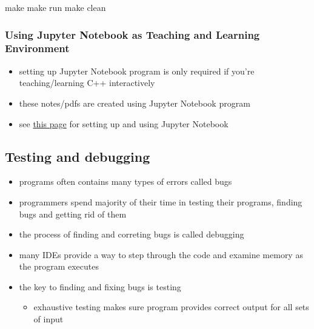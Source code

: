 \documentclass[11pt]{article}
\providecommand{\tightlist}{%
      \setlength{\itemsep}{0pt}\setlength{\parskip}{0pt}}
\newenvironment{Shaded}{}{}
\newcommand{\FunctionTok}[1]{\textcolor[rgb]{0.02,0.16,0.49}{{#1}}}
\newcommand{\NormalTok}[1]{{#1}}
\begin{document}
\begin{Shaded}
\begin{Highlighting}[]
\FunctionTok{make}
\FunctionTok{make}\NormalTok{ run}
\FunctionTok{make}\NormalTok{ clean}
\end{Highlighting}
\end{Shaded}

    \hypertarget{using-jupyter-notebook-as-teaching-and-learning-environment}{%
\subsubsection{Using Jupyter Notebook as Teaching and Learning
Environment}\label{using-jupyter-notebook-as-teaching-and-learning-environment}}

\begin{itemize}
\tightlist
\item
  setting up Jupyter Notebook program is only required if you're
  teaching/learning C++ interactively
\item
  these notes/pdfs are created using Jupyter Notebook program
\item
  see \href{JupyterNotebookSetup.pdf}{this page} for setting up and
  using Jupyter Notebook
\end{itemize}

    \hypertarget{testing-and-debugging}{%
\subsection{Testing and debugging}\label{testing-and-debugging}}

\begin{itemize}
\tightlist
\item
  programs often contains many types of errors called bugs
\item
  programmers spend majority of their time in testing their programs,
  finding bugs and getting rid of them
\item
  the process of finding and correting bugs is called debugging
\item
  many IDEs provide a way to step through the code and examine memory as
  the program executes
\item
  the key to finding and fixing bugs is testing

  \begin{itemize}
  \tightlist
  \item
    exhaustive testing makes sure program provides correct output for
    all sets of input
  \end{itemize}
\end{itemize}
\end{document}
